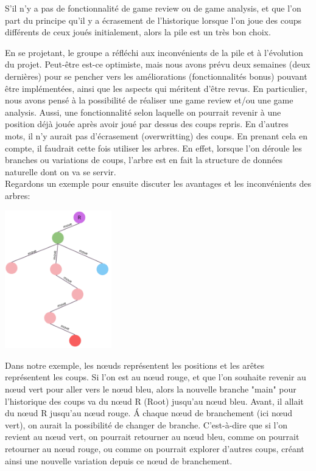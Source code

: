 \documentclass{article}
\begin{document}
S'il n'y a pas de fonctionnalité de game review ou de game analysis, et que l'on part du principe qu'il y a écrasement de l'historique
lorsque l'on joue des coups différents de ceux joués initialement, alors la pile est un très bon choix.\\

\par En se projetant, le groupe a réfléchi aux inconvénients de la pile et à l'évolution du projet.
Peut-être est-ce optimiste, mais nous avons prévu deux semaines (deux dernières) pour se pencher vers les améliorations
(fonctionnalités bonus) pouvant être implémentées, ainsi que les aspects qui méritent d'être revus. En particulier, nous avons
pensé à la possibilité de réaliser une game review et/ou une game analysis. Aussi, une fonctionnalité selon laquelle on pourrait 
revenir à une position déjà jouée après avoir joué par dessus des coups repris. En d'autres mots, il n'y aurait pas d'écrasement
(overwritting) des coups.
En prenant cela en compte, il faudrait cette fois utiliser les arbres. En effet, lorsque l'on déroule les branches ou variations de coups,
l'arbre est en fait la structure de données naturelle dont on va se servir.\\
Regardons un exemple pour ensuite discuter les avantages et les inconvénients des arbres:\\
\begin{center}
    \includegraphics[height=6.0cm]{arbres-branchement-coups.png}
\end{center}

Dans notre exemple, les nœuds représentent les positions
et les arêtes représentent les coups. Si l'on est au nœud rouge, et que l'on souhaite revenir au nœud vert pour aller vers le nœud bleu,
alors la nouvelle branche "main" pour l'historique des coups va du nœud R (Root) jusqu'au nœud bleu. Avant, il allait du nœud R jusqu'au
nœud rouge. \'A chaque nœud de branchement (ici nœud vert), on aurait la possibilité de changer de branche. C'est-à-dire que si l'on revient
au nœud vert, on pourrait retourner au nœud bleu, comme on pourrait retourner au nœud rouge, ou comme on pourrait explorer d'autres coups,
créant ainsi une nouvelle variation depuis ce nœud de branchement.
\end{document}
